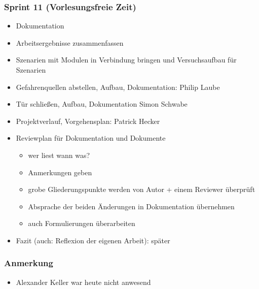 \subsubsection{Sprint 11 (Vorlesungsfreie Zeit)}
\begin{itemize}
	\item Dokumentation
	\item Arbeitsergebnisse zusammenfassen
	\item Szenarien mit Modulen in Verbindung bringen und Versuchsaufbau für Szenarien
	\item Gefahrenquellen abstellen, Aufbau, Dokumentation: Philip Laube
	\item Tür schließen, Aufbau, Dokumentation Simon Schwabe
	\item Projektverlauf, Vorgehensplan: Patrick Hecker
	\item Reviewplan für Dokumentation und Dokumente
	\begin{itemize}
		\item wer liest wann was?
		\item Anmerkungen geben
		\item grobe Gliederungspunkte werden von Autor + einem Reviewer überprüft
		\item Absprache der beiden \textrightarrow{ }Änderungen in Dokumentation übernehmen
		\item auch Formulierungen überarbeiten
	\end{itemize}
	\item Fazit (auch: Reflexion der eigenen Arbeit): später
\end{itemize}

\subsubsection{Anmerkung}
\begin{itemize}
	\item Alexander Keller war heute nicht anwesend
\end{itemize}



